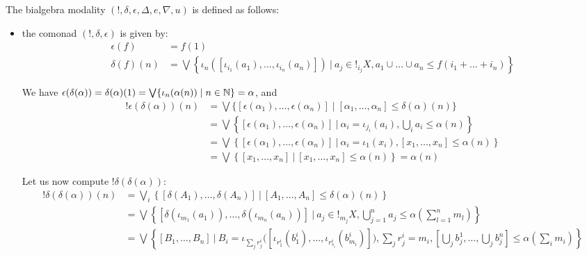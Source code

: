 The bialgebra modality $(!, \delta, \epsilon, \Delta, e, \nabla,u)$ is defined as follows:
\begin{itemize}
\item the comonad $(!,\delta,\epsilon)$ is given by:
{\small
\begin{align*}
\epsilon(f)& =  f(1) \\
\delta(f)(n) & = \bigvee\left\{ 
\iota_{n}([\iota_{i_{1}}(a_{1}), \dots , \iota_{i_{n}}(a_{n})]) \ \Big \vert \ 
a_{j}\in !_{i_{j}}X,  
a_{1}\cup \dots \cup a_{n}\leq f(i_{1}+\dots+ i_{n})
\right\}
\end{align*}
}

We have $\epsilon(\delta(\alpha))=\delta(\alpha)(1)=
\bigvee\{\iota_{n}(\alpha(n))\mid n\in \mathbb{N}\}=\alpha$, and 
{\small
\begin{align*}
!\epsilon(\delta(\alpha))(n)&=
\bigvee\{ [\epsilon(\alpha_{1}),\dots, \epsilon(\alpha_{n})]
\mid
[\alpha_{1},\dots, \alpha_{n}] \leq \delta(\alpha)(n)\}
 \\
 &=
 \bigvee\left \{ [\epsilon(\alpha_{1}),\dots, \epsilon(\alpha_{n})]
\ \Bigg \vert \ 
\alpha_{i}=\iota_{j_{i}}(a_{i}),\bigcup_{i}a_{i}\leq 
%
\alpha(n)
\right \} \\
&=
 \bigvee\left \{ [\epsilon(\alpha_{1}),\dots, \epsilon(\alpha_{n})]
\ \Bigg \vert \ 
\alpha_{i}=\iota_{1}(x_{i}),[x_{1},\dots, x_{n}]\leq 
\alpha(n)
\right \} \\
&= \bigvee\left \{ [
x_{1},\dots, x_{n}] \ \Bigg \vert  \ 
[x_{1},\dots, x_{n}]\leq \alpha(n)
\right \} = \alpha(n)
 \end{align*}
 }


Let us now compute $!\delta(\delta (\alpha))$: 
{\small
\begin{align*}
!\delta(\delta(\alpha))(n)&=\bigvee_{i}\left \{[\delta(A_{1}),\dots, \delta(A_{n})]\ \Bigg\vert \   [A_{1},\dots, A_{n}]\leq \delta(\alpha)(n)\right\}\\
&=\bigvee\left \{[\delta(\iota_{m_{1}}(a_{1})),\dots, \delta(\iota_{m_{n}}(a_{n}))]\ \Bigg\vert \  
a_{j}\in !_{m_{j}}X, 
\bigcup_{j=1}^{n}a_{j}\leq \alpha(\sum_{l=1}^{n}m_{l})
\right\}\\
&= \bigvee \left\{
[ B_{1},\dots, B_{n}] \ \Bigg \vert \ 
B_{i}=\iota_{\sum_{j}r_{j}^{i}}\big([\iota_{r_{1}^{i}}(b_{1}^{i}),\dots, \iota_{r_{s_{i}}^{i}}(b_{m_{i}}^{i})]\big),\sum_{j}r_{j}^{i}=m_{i}, 
\left [\bigcup_{j}b_{j}^{1},\dots, \bigcup_{j}b_{j}^{n}\right ]\leq \alpha(\sum_{i}m_{i})
\right \}
\end{align*}
}



\end{itemize}
